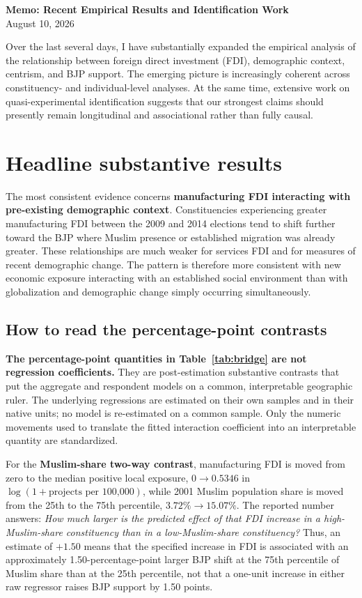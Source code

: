 \documentclass[11pt]{article}
\begin{document}
\begin{center}
{\Large\bfseries Memo: Recent Empirical Results and Identification Work}\\[0.25em]
{\normalsize August 10, 2026}
\end{center}

Over the last several days, I have substantially expanded the empirical analysis of the relationship between foreign direct investment (FDI), demographic context, centrism, and BJP support. The emerging picture is increasingly coherent across constituency- and individual-level analyses. At the same time, extensive work on quasi-experimental identification suggests that our strongest claims should presently remain longitudinal and associational rather than fully causal.

\section*{Headline substantive results}

The most consistent evidence concerns \textbf{manufacturing FDI interacting with pre-existing demographic context}. Constituencies experiencing greater manufacturing FDI between the 2009 and 2014 elections tend to shift further toward the BJP where Muslim presence or established migration was already greater. These relationships are much weaker for services FDI and for measures of recent demographic change. The pattern is therefore more consistent with new economic exposure interacting with an established social environment than with globalization and demographic change simply occurring simultaneously.

\subsection*{How to read the percentage-point contrasts}

\textbf{The percentage-point quantities in Table~\ref{tab:bridge} are not regression coefficients.} They are post-estimation substantive contrasts that put the aggregate and respondent models on a common, interpretable geographic ruler. The underlying regressions are estimated on their own samples and in their native units; no model is re-estimated on a common sample. Only the numeric movements used to translate the fitted interaction coefficient into an interpretable quantity are standardized.

For the \textbf{Muslim-share two-way contrast}, manufacturing FDI is moved from zero to the median positive local exposure, $0\rightarrow0.5346$ in $\log(1+\text{projects per 100,000})$, while 2001 Muslim population share is moved from the 25th to the 75th percentile, $3.72\%\rightarrow15.07\%$. The reported number answers: \emph{How much larger is the predicted effect of that FDI increase in a high-Muslim-share constituency than in a low-Muslim-share constituency?} Thus, an estimate of $+1.50$ means that the specified increase in FDI is associated with an approximately 1.50-percentage-point larger BJP shift at the 75th percentile of Muslim share than at the 25th percentile, not that a one-unit increase in either raw regressor raises BJP support by 1.50 points.
\end{document}
